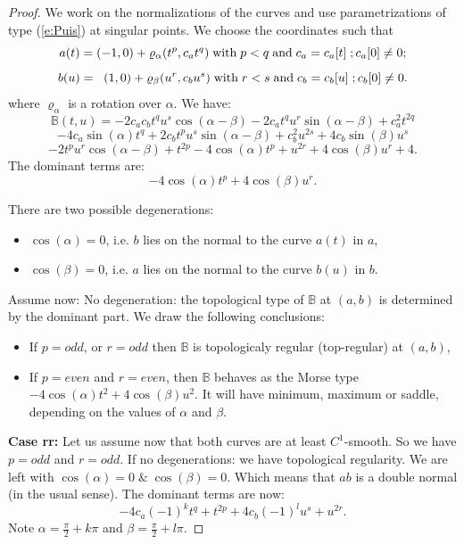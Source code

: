 \documentclass[12pt,a4,twoside]{amsart}
\newtheorem*{main lemma}{The main lemma}
\begin{document}
\begin{proof}
We work on the normalizations of the curves and use parametrizations of type (\ref{e:Puis}) at singular points. 
We choose the coordinates such that
$$ a(t) = (-1,0) +\varrho_{\alpha}(t^p, c_a t^q)   \;  \mbox{\rm with} \;  p <q  \;  \mbox{\rm and}\;  c_a = c_a[t] \; ; c_a[0] \ne 0  ;$$
$$ b(u) =\;  \; (1,0) + \varrho_{\beta} (u^r, c_b u^s)  \;  \mbox{\rm with} \;  r <s  \;  \mbox{\rm and}\;  c_b = c_b[u]\; ; c_b[0] \ne 0. $$
where $\varrho_{\alpha}$ is a rotation over $\alpha$. We have:
$$\mathbb{B} (t,u) =
-2 c_a c_b t^q u^s \cos (\alpha -\beta )-2 c_a t^q u^r \sin (\alpha -\beta )+c_a^2 t^{2 q}$$ $$-4 c_a \sin (\alpha ) t^q +2 c_b t^p u^s \sin (\alpha -\beta )+c_b^2 u^{2 s}+4 c_b \sin (\beta ) u^s$$ $$ - 2 t^p u^r \cos (\alpha -\beta )+t^{2 p} -4 \cos (\alpha ) t^p +u^{2 r}+4 \cos (\beta ) u^r+4.
$$
The dominant terms are:
\begin{equation}\label{dominant}
-4 \cos (\alpha ) t^p +4 \cos (\beta ) u^r.
 \end{equation}


There are two possible degenerations:
\begin{itemize}
\item $\cos (\alpha )= 0$, i.e.  $b$ lies on the normal to the curve $a(t)$ in $a$,
\item $\cos (\beta) = 0$, i.e. $a$ lies on the normal to the curve $b(u)$ in $b$.
\end{itemize}


Assume now: No degeneration:  the topological type of $\mathbb{B}$  at $(a,b)$ is determined by the dominant part.
We draw the following conclusions:
\begin{itemize}
\item If $p = odd$, or $r= odd$ then $\mathbb{B}$ is topologicaly regular (top-regular) at $(a,b)$,
\item If $p = even$ and $r = even$,
 then $\mathbb{B}$ behaves as  the Morse type $ -4 \cos (\alpha ) t^2 +4 \cos (\beta ) u^2$.
 It will have minimum, maximum or saddle, depending on the values of $\alpha$ and $\beta$.
\end{itemize}

{\bf Case rr:} Let us assume now that both curves are at least $C^1$-smooth. So we have $p=odd$ and $r=odd$.
If no degenerations: we have topological regularity. We are left with $\cos (\alpha) = 0 \;  \&  \;\cos (\beta) = 0$.
Which means that $ab$ is a double normal (in the usual sense). The dominant terms are now:
\begin{equation}\label{rr-condition}
 -4 c_a (-1)^k t^q +t^{2 p} +4 c_b (-1)^l u^s+u^{2 r}.
 \end{equation}
Note $  \alpha = \frac{\pi}{2} + k \pi$ and $\beta = \frac{\pi}{2} + l \pi$. 


\end{proof}
\end{document}
